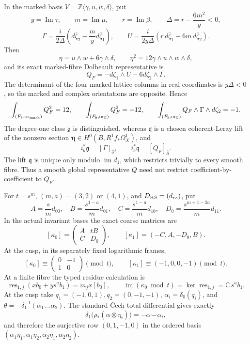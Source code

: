 {\ResultSmall
In the marked basis \(V=\mathbb Z\langle\gamma,u,w,\delta\rangle\), put
\[
 y=\operatorname{Im}\tau,\qquad m=\operatorname{Im}\mu,\qquad
 r=\operatorname{Im}\beta,\qquad
 \Delta=r-\frac{6m^2}{y}<0,
\]
\[
 \Gamma=\frac{i}{2\Delta}
 \left(d\bar\zeta_2-\frac{m}{y}d\bar\zeta_1\right),\qquad
 U=\frac{i}{2y\Delta}
 \left(r\,d\bar\zeta_1-6m\,d\bar\zeta_2\right).
\]
Then
\[
 \eta=u\wedge w+6\gamma\wedge\delta,
 \qquad \eta^2=12\gamma\wedge u\wedge w\wedge\delta,
\]
and its exact marked-fibre Dolbeault representative is
\[
 Q_F=-d\zeta_1\wedge U-6d\zeta_2\wedge\Gamma.
\]
The determinant of the four marked lattice columns in real coordinates is
\(y\Delta<0\), so the marked and complex orientations are opposite.  Hence
\[
 \int_{(F_b,{\rm or}_{\rm mark})}Q_F^2=12,
 \qquad
 \int_{(F_b,{\rm or}_{\mathbb C})}Q_F^2=-12,
 \qquad
 \int_{(F_b,{\rm or}_{\mathbb C})}
 Q_F\wedge\Gamma\wedge d\zeta_2=-1.
\]
The degree-one class \(\mathfrak g\) is distinguished, whereas
\(\mathfrak q\) is a chosen coherent-Leray lift of the nonzero section
\(\boldsymbol\eta\in H^0(B,R^1f_*\Omega_X^1)\), and
\[
 i_b^*\mathfrak g=[\Gamma]_{\bar\partial},\qquad
 i_b^*\mathfrak q=[Q_F]_{\bar\partial}.
\]
The lift \(\mathfrak q\) is unique only modulo \(\operatorname{im}d_1\),
which restricts trivially to every smooth fibre.  Thus a smooth global
representative \(Q\) need not restrict coefficient-by-coefficient to \(Q_F\).
}

{\ResultSmall
For \(t=s^m\), \((m,a)=(3,2)\) or \((4,1)\), and
\(D_{\rm KS}=(d_{rs})\), put
\[
 A=\frac{s}{m}d_{00},\quad B=\frac{s^{1-a}}m d_{01},\quad
 C=\frac{s^{1-a}}m d_{10},\quad
 D_0=\frac{s^{m+1-2a}}m d_{11}.
\]
In the actual invariant bases the exact coarse matrices are
\[
 [\kappa_0]=\begin{pmatrix}A&tB\\C&D_0\end{pmatrix},
 \qquad [\kappa_1]=(-C,A,-D_0,B).
\]
At the cusp, in its separately fixed logarithmic frames,
\[
 [\kappa_0]\equiv\begin{pmatrix}0&-1\\1&0\end{pmatrix}\pmod t,
 \qquad [\kappa_1]\equiv(-1,0,0,-1)\pmod t.
\]
At a finite fibre the typed residue calculation is
\[
 \operatorname{res}_{1,j}(xb_0+ys^ab_1)=m_jx[b_0],\qquad
 \operatorname{im}(\kappa_0\bmod t)
 =\ker\operatorname{res}_{1,j}=\mathbb C\,s^ab_1.
\]
At the cusp take
\(q_1=(-1,0,1),q_2=(0,-1,-1)\),
\(\alpha_i=\delta_0(q_i)\), and
\(\theta=-\delta_1^{-1}(\alpha_1\smile\alpha_2)\).  The standard
\v Cech total differential gives exactly
\[
 \delta_1\bigl(\rho_*(\alpha\otimes\eta_i)\bigr)
 =-\alpha\smile\alpha_i,
\]
and therefore the surjective row \((0,1,-1,0)\) in the ordered basis
\((\alpha_1\eta_1,\alpha_1\eta_2,\alpha_2\eta_1,\alpha_2\eta_2)\).
}

